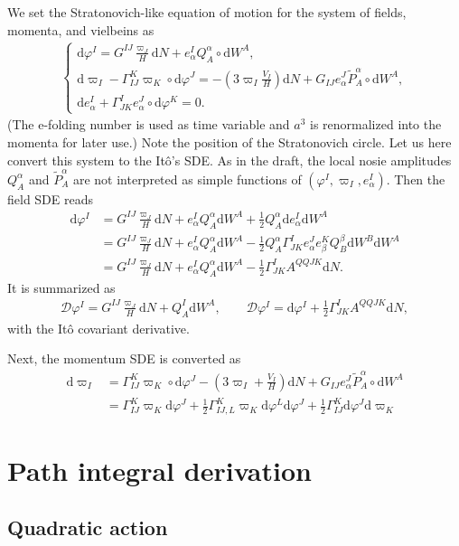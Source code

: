 \documentclass[aps, prd
, preprint
, nofootinbib 
, longbibliography
]{revtex4-1}
\newcommand{\dd}{\mathrm{d}}
\newcommand{\dps}{\displaystyle}
\newcommand{\calD}{\mathcal{D}}
\newcommand{\bae}[1]{\begin{align} #1 \end{align}}
\newcommand{\bce}[1]{\begin{cases} #1 \end{cases}}
\begin{document}
We set the Stratonovich-like equation of motion for the system of fields, momenta, and vielbeins as
\bae{
    \bce{
        \dps
        \dd\varphi^I=G^{IJ}\frac{\varpi_J}{H}\dd N+e^I_\alpha Q^\alpha_A\circ\dd W^A, \\
        \dps
        \dd\varpi_I-\Gamma_{IJ}^K\varpi_K\circ\dd\varphi^J=-\left(3\varpi_I\frac{V_I}{H}\right)\dd N+G_{IJ}e^J_\alpha\tilde{P}^\alpha_A\circ\dd W^A, \\
        \dps
        \dd e^I_\alpha+\Gamma^I_{JK}e^J_\alpha\circ\dd\varphi^K=0.
    }    
}
(The e-folding number is used as time variable and $a^3$ is renormalized into the momenta for later use.)
Note the position of the Stratonovich circle.
Let us here convert this system to the It\^o's SDE. As in the draft, the local nosie amplitudes $Q^\alpha_A$ and $\tilde{P}^\alpha_A$ are not interpreted as simple functions of $(\varphi^I,\varpi_I,e^I_\alpha)$.
Then the field SDE reads
\bae{
    \dd\varphi^I&=G^{IJ}\frac{\varpi_J}{H}\dd N+e^I_\alpha Q^\alpha_A\dd W^A+\frac{1}{2}Q^\alpha_A\dd e^I_\alpha\dd W^A \nonumber \\
    &=G^{IJ}\frac{\varpi_J}{H}\dd N+e^I_\alpha Q^\alpha_A\dd W^A-\frac{1}{2}Q^\alpha_A\Gamma^I_{JK}e^J_\alpha e^K_\beta Q^\beta_B\dd W^B\dd W^A \nonumber \\
    &=G^{IJ}\frac{\varpi_J}{H}\dd N+e^I_\alpha Q^\alpha_A\dd W^A-\frac{1}{2}\Gamma^I_{JK}A^{QQJK}\dd N.
}
It is summarized as
\bae{
    \calD\varphi^I=G^{IJ}\frac{\varpi_J}{H}\dd N+Q^I_A\dd W^A, \qquad \calD\varphi^I=\dd\varphi^I+\frac{1}{2}\Gamma^I_{JK}A^{QQJK}\dd N,
}
with the It\^o covariant derivative.

Next, the momentum SDE is converted as
\bae{
    \dd\varpi_I&=\Gamma^K_{IJ}\varpi_K\circ\dd\varphi^J-\left(3\varpi_I+\frac{V_I}{H}\right)\dd N+G_{IJ}e^J_\alpha\tilde{P}^\alpha_A\circ\dd W^A \nonumber \\
    &=\Gamma^K_{IJ}\varpi_K\dd\varphi^J+\frac{1}{2}\Gamma^K_{IJ,L}\varpi_K\dd\varphi^L\dd\varphi^J+\frac{1}{2}\Gamma^K_{IJ}\dd\varphi^J\dd\varpi_K
}




\section{Path integral derivation}

\subsection{Quadratic action}
\end{document}
